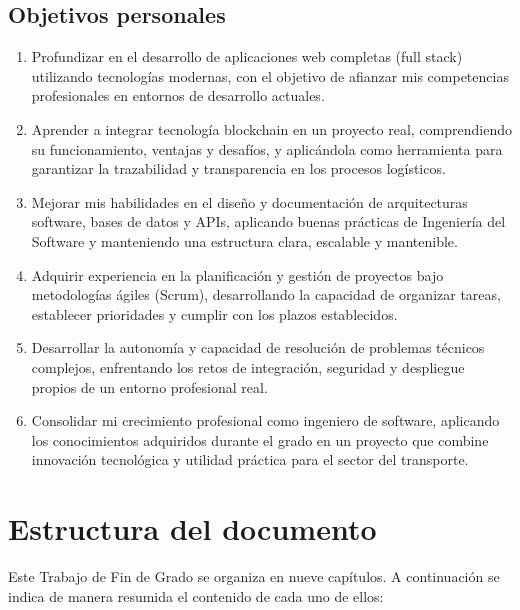 \subsection{Objetivos personales}
\begin{enumerate}
    \item Profundizar en el desarrollo de aplicaciones web completas (full stack) utilizando tecnologías modernas, con el objetivo de afianzar mis competencias profesionales en entornos de desarrollo actuales.
    \item Aprender a integrar tecnología blockchain en un proyecto real, comprendiendo su funcionamiento, ventajas y desafíos, y aplicándola como herramienta para garantizar la trazabilidad y transparencia en los procesos logísticos.
    \item Mejorar mis habilidades en el diseño y documentación de arquitecturas software, bases de datos y APIs, aplicando buenas prácticas de Ingeniería del Software y manteniendo una estructura clara, escalable y mantenible.
    \item Adquirir experiencia en la planificación y gestión de proyectos bajo metodologías ágiles (Scrum), desarrollando la capacidad de organizar tareas, establecer prioridades y cumplir con los plazos establecidos.
    \item Desarrollar la autonomía y capacidad de resolución de problemas técnicos complejos, enfrentando los retos de integración, seguridad y despliegue propios de un entorno profesional real.
    \item Consolidar mi crecimiento profesional como ingeniero de software, aplicando los conocimientos adquiridos durante el grado en un proyecto que combine innovación tecnológica y utilidad práctica para el sector del transporte.
\end{enumerate}

\section{Estructura del documento}
Este Trabajo de Fin de Grado se organiza en nueve capítulos. A continuación se indica de manera resumida el contenido de cada uno de ellos:


